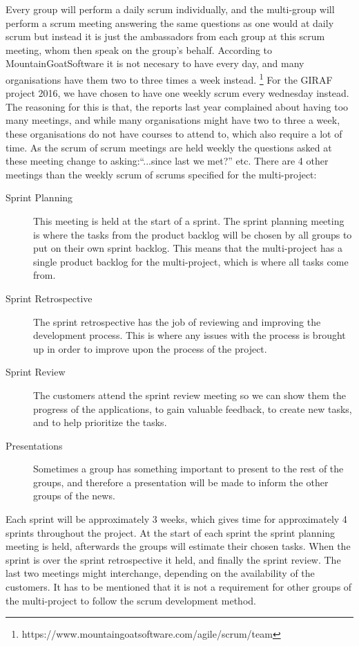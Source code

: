 Every group will perform a daily scrum individually, and the multi-group will perform a scrum meeting answering the same questions as one would at daily scrum but instead it is just the ambassadors from each group at this scrum meeting, whom then speak on the group's behalf.
According to MountainGoatSoftware it is not necesary to have every day, and many organisations have them two to three times a week instead. \footnote{https://www.mountaingoatsoftware.com/agile/scrum/team}
For the GIRAF project 2016, we have chosen to have one weekly scrum every wednesday instead.
The reasoning for this is that, the reports last year complained about having too many meetings, and while many organisations might have two to three a week, these organisations do not have courses to attend to, which also require a lot of time.
As the scrum of scrum meetings are held weekly the questions asked at these meeting change to asking:``...since last we met?'' etc.
There are 4 other meetings than the weekly scrum of scrums specified for the multi-project:

\begin{description}
	\item[Sprint Planning] This meeting is held at the start of a sprint.
	The sprint planning meeting is where the tasks from the product backlog will be chosen by all groups to put on their own sprint backlog.
	This means that the multi-project has a single product backlog for the multi-project, which is where all tasks come from.
	\item[Sprint Retrospective] The sprint retrospective has the job of reviewing and improving the development process. 
	This is where any issues with the process is brought up in order to improve upon the process of the project.
	\item[Sprint Review] The customers attend the sprint review meeting so we can show them the progress of the applications, to gain valuable feedback, to create new tasks, and to help prioritize the tasks. 
	\item[Presentations] Sometimes a group has something important to present to the rest of the groups, and therefore a presentation will be made to inform the other groups of the news.
\end{description}

Each sprint will be approximately 3 weeks, which gives time for approximately 4 sprints throughout the project.
At the start of each sprint the sprint planning meeting is held, afterwards the groups will estimate their chosen tasks.
When the sprint is over the sprint retrospective it held, and finally the sprint review.
The last two meetings might interchange, depending on the availability of the customers.
It has to be mentioned that it is not a requirement for other groups of the multi-project to follow the scrum development method.

